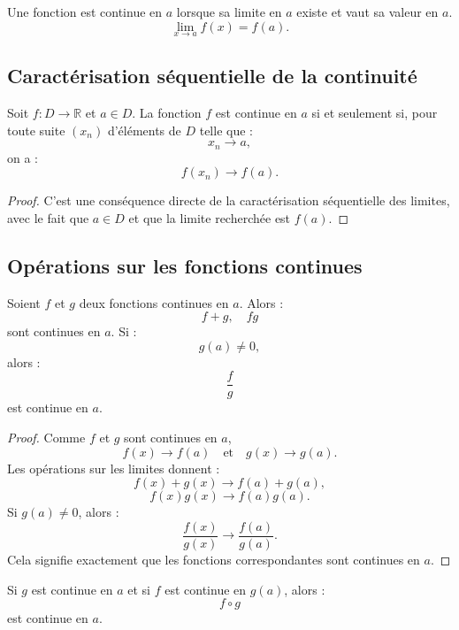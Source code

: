 \documentclass[11pt,a4paper]{article}
\newcommand{\R}{\mathbb R}
\begin{document}
\begin{retenirbox}
Une fonction est continue en \(a\) lorsque sa limite en \(a\) existe et vaut sa valeur en \(a\).
\[
\lim_{x\to a}f(x)=f(a).
\]
\end{retenirbox}

\subsection{Caractérisation séquentielle de la continuité}

\begin{theorembox}
Soit \(f:D\to\R\) et \(a\in D\).  
La fonction \(f\) est continue en \(a\) si et seulement si, pour toute suite \((x_n)\) d'éléments de \(D\) telle que :
\[
x_n\to a,
\]
on a :
\[
f(x_n)\to f(a).
\]
\end{theorembox}

\begin{proof}
C'est une conséquence directe de la caractérisation séquentielle des limites, avec le fait que \(a\in D\) et que la limite recherchée est \(f(a)\).
\end{proof}

\subsection{Opérations sur les fonctions continues}

\begin{theorembox}
Soient \(f\) et \(g\) deux fonctions continues en \(a\).  
Alors :
\[
f+g,\quad fg
\]
sont continues en \(a\).  
Si :
\[
g(a)\neq0,
\]
alors :
\[
\frac{f}{g}
\]
est continue en \(a\).
\end{theorembox}

\begin{proof}
Comme \(f\) et \(g\) sont continues en \(a\),
\[
f(x)\to f(a)
\quad\text{et}\quad
g(x)\to g(a).
\]
Les opérations sur les limites donnent :
\[
f(x)+g(x)\to f(a)+g(a),
\]
\[
f(x)g(x)\to f(a)g(a).
\]
Si \(g(a)\neq0\), alors :
\[
\frac{f(x)}{g(x)}\to\frac{f(a)}{g(a)}.
\]
Cela signifie exactement que les fonctions correspondantes sont continues en \(a\).
\end{proof}

\begin{theorembox}
Si \(g\) est continue en \(a\) et si \(f\) est continue en \(g(a)\), alors :
\[
f\circ g
\]
est continue en \(a\).
\end{theorembox}
\end{document}
